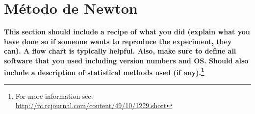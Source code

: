 \chapter{Método de Newton}

\textbf{This section should include a recipe of what you did (explain what you
have done so if someone wants to reproduce the experiment, they can).  A flow
chart is typically helpful.  Also, make sure to define all software that you
used including version numbers and OS.  Should also include a description of
statistical methods used (if any).\footnote{For more information see:
\url{http://rc.rcjournal.com/content/49/10/1229.short}}}
